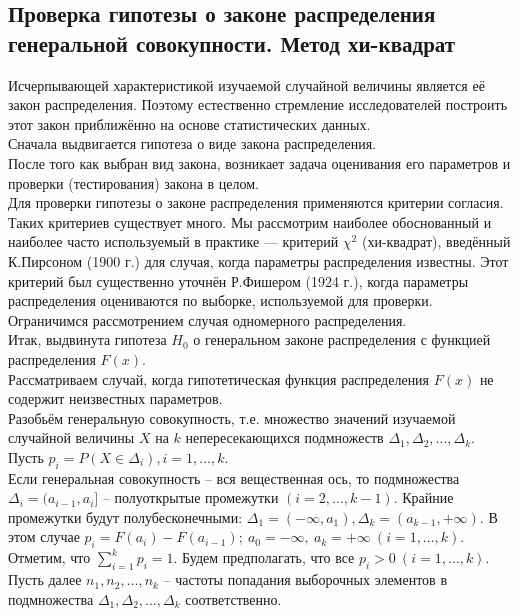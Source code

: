 \subsection{Проверка гипотезы о законе распределения генеральной совокупности. Метод хи-квадрат}
Исчерпывающей характеристикой изучаемой случайной величины является её закон распределения. Поэтому естественно стремление исследователей построить этот закон приближённо на основе статистических данных. \\
Сначала выдвигается гипотеза о виде закона распределения. \\
После того как выбран вид закона, возникает задача оценивания его параметров и проверки (тестирования) закона в целом. \\
Для проверки гипотезы о законе распределения применяются критерии согласия. Таких критериев существует много. Мы рассмотрим наиболее обоснованный и наиболее часто используемый в практике — критерий $\chi^2$ (хи-квадрат), введённый К.Пирсоном (1900 г.) для случая, когда параметры распределения известны. Этот критерий был существенно уточнён Р.Фишером (1924 г.), когда параметры распределения оцениваются по выборке, используемой для проверки. \\
Ограничимся рассмотрением случая одномерного распределения. \\
Итак, выдвинута гипотеза $H_0$ о генеральном законе распределения с функцией распределения $F(x)$. \\
Рассматриваем случай, когда гипотетическая функция распределения $F(x)$ не содержит неизвестных параметров. \\
Разобьём генеральную совокупность, т.е. множество значений изучаемой случайной величины $X$ на $k$ непересекающихся подмножеств $\Delta_1, \Delta_2, \dots, \Delta_k$. \\
Пусть $p_i = P (X \in \Delta_i), i = 1, \dots, k$. \\
Если генеральная совокупность -- вся вещественная ось, то подмножества $\Delta_i = (a_{i-1}, a_i]$ -- полуоткрытые промежутки $(i = 2, \dots, k - 1)$. Крайние промежутки будут полубесконечными: $\Delta_1 = (-\infty, a_1), \Delta_k = (a_{k-1}, +\infty)$. В этом случае $p_i = F(a_i) - F(a_{i-1}); \ a_0 = -\infty, \ a_k = +\infty \ (i = 1, \dots, k)$. \\
Отметим, что $\sum_{i=1}^{k} p_i = 1$. Будем предполагать, что все $p_i > 0 \ (i = 1, \dots, k)$. \\
Пусть далее $n_1, n_2, \dots, n_k$ -- частоты  попадания выборочных элементов в подмножества $\Delta_1, \Delta_2, \dots, \Delta_k$ соответственно. \\
